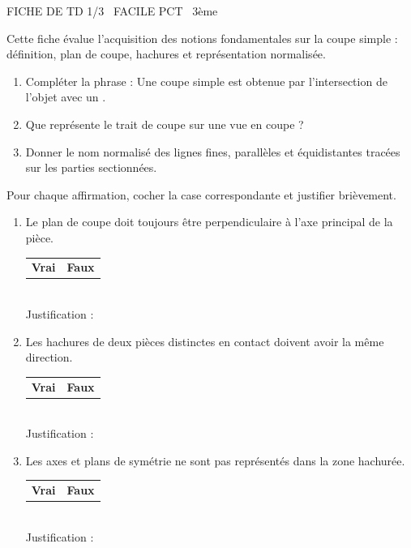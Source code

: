 \documentclass[11pt]{article}
\begin{document}
\begin{tcolorbox}[enhanced,colback=popink,colframe=popink,arc=10pt,boxrule=0pt,left=12pt,right=12pt,top=9pt,bottom=9pt]
{\color{white}\popxbold\small FICHE DE TD 1/3 \textbullet\ FACILE \hfill PCT \textbullet\ 3ème\par}
\end{tcolorbox}
\vspace{4pt}
Cette fiche évalue l'acquisition des notions fondamentales sur la coupe simple : définition, plan de coupe, hachures et représentation normalisée.

\begin{exercice}
\begin{enumerate}
    \item Compléter la phrase : Une coupe simple est obtenue par l'intersection de l'objet avec un \underline{\hspace{5cm}}.
    \item Que représente le trait de coupe sur une vue en coupe ? \underline{\hspace{5cm}}
    \item Donner le nom normalisé des lignes fines, parallèles et équidistantes tracées sur les parties sectionnées. \underline{\hspace{5cm}}
\end{enumerate}
\end{exercice}

\begin{exercice}
Pour chaque affirmation, cocher la case correspondante et justifier brièvement.
\begin{enumerate}
    \item Le plan de coupe doit toujours être perpendiculaire à l'axe principal de la pièce.
    \begin{tabular}{cc} \textbf{Vrai} & \textbf{Faux} \end{tabular} \\
    Justification : \underline{\hspace{10cm}}
    \item Les hachures de deux pièces distinctes en contact doivent avoir la même direction.
    \begin{tabular}{cc} \textbf{Vrai} & \textbf{Faux} \end{tabular} \\
    Justification : \underline{\hspace{10cm}}
    \item Les axes et plans de symétrie ne sont pas représentés dans la zone hachurée.
    \begin{tabular}{cc} \textbf{Vrai} & \textbf{Faux} \end{tabular} \\
    Justification : \underline{\hspace{10cm}}
\end{enumerate}
\end{exercice}
\end{document}
